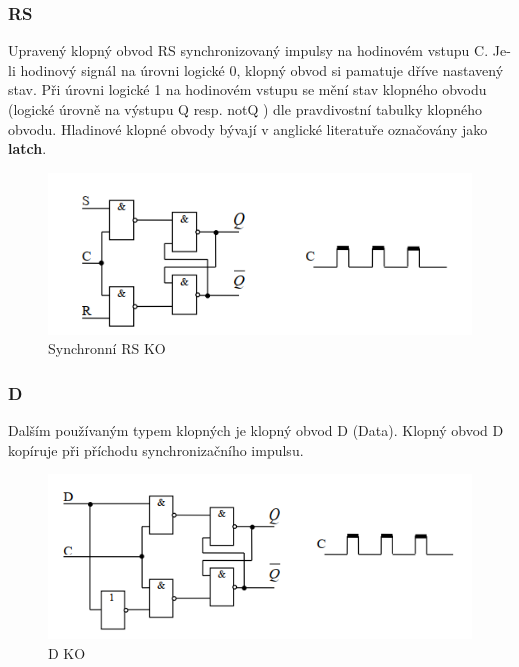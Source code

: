 \subsubsection*{RS}
Upravený klopný obvod RS synchronizovaný impulsy na hodinovém
vstupu C. Je-li hodinový signál na úrovni logické 0, klopný obvod si pamatuje dříve
nastavený stav. Při úrovni logické 1 na hodinovém vstupu se mění stav klopného obvodu
(logické úrovně na výstupu Q resp. notQ ) dle pravdivostní tabulky klopného obvodu. Hladinové klopné obvody bývají v anglické literatuře označovány jako \textbf{latch}.
   \begin{figure}[h]
   \begin{center}
     \includegraphics[scale=0.6]{images/RSsynch.png}
   \end{center}
   \caption{Synchronní RS KO}
  \end{figure}

\subsubsection*{D}
  Dalším používaným typem klopných je klopný obvod D (Data). Klopný obvod D kopíruje při příchodu synchronizačního impulsu.
   \begin{figure}[h]
   \begin{center}
     \includegraphics[scale=0.6]{images/D.png}
   \end{center}
   \caption{D KO}
  \end{figure}  

